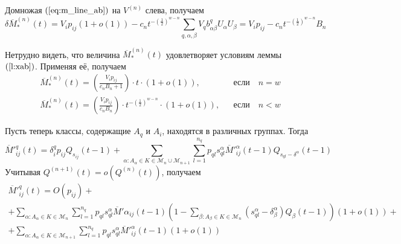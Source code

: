 \documentclass[12pt]{article}
\begin{document}
Домножая $(\ref{eq:m_line_ab})$ на $V^{(n)}$ слева, получаем
\begin{equation*}
	\delta \overline{M}^{(n)}_*(t) = V_i p_{ij} (1 + o(1)) - c_n t^{-\left(\frac{1}{2}\right)^{w-n}} \sum_{q,\alpha,\beta} V_q b^q_{\alpha \beta} U_\alpha U_\beta = V_i p_{ij} - c_n t^{-\left(\frac{1}{2}\right)^{w-n}} B_n
\end{equation*}

Нетрудно видеть, что величина $\overline{M}^{(n)}_*(t)$ удовлетворяет условиям леммы $(\ref{l:xab})$. Применяя её, получаем
\begin{align*}
	&\overline{M}^{(n)}_*(t) = \left( \frac{V_i p_{ij}}{c_n B_n + 1} \right) \cdot t \cdot (1 + o(1)), & &\text{если}\quad n = w \\
	&\overline{M}^{(n)}_*(t) = \left( \frac{V_i p_{ij}}{c_n B_n} \right) \cdot t^{-\left(\frac{1}{2}\right)^{w-n}} \cdot (1 + o(1)), & &\text{если}\quad n < w
\end{align*}

Пусть теперь классы, содержащие $A_q$ и $A_i$, находятся в различных группах. Тогда
\begin{equation*}
	\overline{M}'^q_{ij}(t) = \delta^q_i p_{ij} Q_{s_{ij}}(t-1) + \sum_{\alpha : A_\alpha \in K \in \mathcal{M}_n \cup \mathcal{M}_{n+1}} \sum_{l = 1}^{n_q} p_{ql} s_{ql}^\alpha \overline{M}'^\alpha_{ij}(t-1) Q_{s_{ql} - \delta^\alpha}(t-1)
\end{equation*}
Учитывая $Q^{(n+1)}(t) = o(Q^{(n)}(t))$, получаем
\begin{multline*}
\label{eq:muv}
	\overline{M}'^q_{ij}(t) = O(p_{ij}) + \\
	+ \sum_{\alpha : A_\alpha \in K \in \mathcal{M}_n} \sum_{l = 1}^{n_q} p_{ql} s_{ql}^\alpha \overline{M}'\alpha_{ij}(t-1) \left( 1 - \sum_{\beta : A_\beta \in K \in \mathcal{M}_n} (s_{ql}^\alpha - \delta^\alpha_\beta) Q_\beta(t-1) \right) (1 + o(1)) + \\
	+ \sum_{\alpha : A_\alpha \in K \in \mathcal{M}_{n+1}} \sum_{l = 1}^{n_q} p_{ql} s_{ql}^\alpha \overline{M}'^\alpha_{ij}(t-1) (1 + o(1))
\end{multline*}
\end{document}
